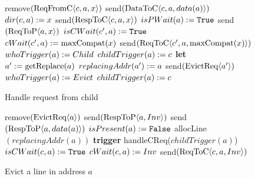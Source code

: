 \begin{figure}
\begin{algorithmic}
           \State remove$(\text{ReqFromC$\langle c,a,x\rangle$})$
              \State send$(\text{DataToC$\langle c,a,data(a)\rangle$})$
           \EndIf
           \State $dir(c, a) := x$
           \State send$(\text{RespToC$\langle c,a,x\rangle$})$
        \Else
              \State $isPWait(a) := \texttt{True}$
              \State send$(\text{ReqToP$\langle a,x\rangle$})$
           \EndIf
                 \State $isCWait(c', a) := \texttt{True}$
                 \State $cWait(c', a) := \text{maxCompat}(x)$
                 \State send$(\text{ReqToC$\langle c',a,\text{maxCompat}(x)\rangle$})$
              \EndIf
           \EndFor
           \State \textcolor{trig-color}{$whoTrigger(a) := Child$}
           \State \textcolor{trig-color}{$childTrigger(a) := c$}
        \EndIf
     \EndIf
  \Else
     \State \textbf{let} $a' := \text{getReplace}(a)$
        \State $replacingAddr(a') := a$
        \State send$(\text{EvictReq$\langle a'\rangle$})$
        \State \textcolor{trig-color}{$whoTrigger(a) := Evict$}
        \State \textcolor{trig-color}{$childTrigger(a) := c$}
     \EndIf
  \EndIf
\EndRule
\end{algorithmic}
\caption{Handle request from child}
\label{alg:handleCReq}
\end{figure}

\begin{figure}
\begin{algorithmic}
      \State remove$(\text{EvictReq$\langle a\rangle$})$
         \State send$(\text{RespToP$\langle a,\text{$Inv$}\rangle$})$
            \State send$(\text{RespToP$\langle a,data(a)\rangle$})$
         \EndIf
      \EndIf
      \State $isPresent(a) := \texttt{False}$
      \State allocLine$(replacingAddr(a))$
      \State \textcolor{trig-color}{\textbf{trigger} handleCReq($childTrigger(a)$)}
   \Else
               \State $isCWait(c, a) := \texttt{True}$
               \State $cWait(c, a) := \text{$Inv$}$
               \State send$(\text{ReqToC$\langle c,a,\text{$Inv$}\rangle$})$
            \EndIf
         \EndFor
      \EndIf
   \EndIf
\EndRule
\end{algorithmic}
\caption{Evict a line in address $a$}
\label{alg:handleEvict}
\end{figure}

